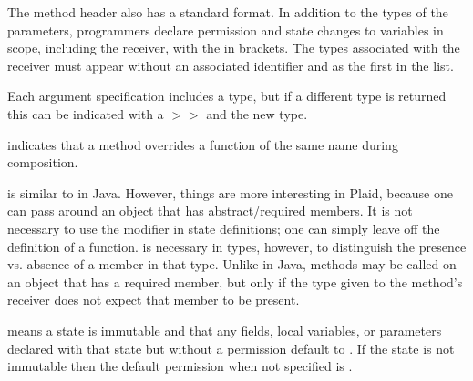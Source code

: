 The method header  also has a standard
format. In addition to the types of the parameters, programmers
declare permission and state 
changes to variables in scope, including the receiver, with the 
 in brackets.  The types associated with the receiver
must appear without an associated identifier and as the first 
 in the list.

Each argument specification includes a type, but if a different
type is returned this can be indicated with a $>>$ and the new
type.

\begin{quote}



 {}

 {}


 {}


 {}

 {}

\end{quote}


 indicates that a method overrides a function of the
same name during composition.

 is similar to  in Java.  However,
things are more interesting in Plaid, because one can pass around an
object that has abstract/required members.  It is not necessary to
use the  modifier in state definitions; one can simply
leave off the definition of a function.   is necessary
in types, however, to distinguish the presence vs. absence of a
member in that type.  Unlike in Java, methods may be called on an
object that has a required member, but only if the type given to the
method's receiver does not expect that member to be present.

 means a state is immutable and that any fields,
local variables, or parameters declared with that state but without
a permission default to .  If the state is not immutable
then the default permission when not specified is .


